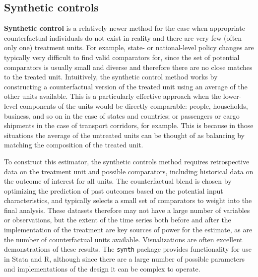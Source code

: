 \subsection{Synthetic controls}

\textbf{Synthetic control} is a relatively newer method
for the case when appropriate counterfactual individuals
do not exist in reality and there are very few (often only one) treatment units.\cite{abadie2015comparative}
For example, state- or national-level policy changes
are typically very difficult to find valid comparators for,
since the set of potential comparators is usually small and diverse
and therefore there are no close matches to the treated unit.
Intuitively, the synthetic control method works
by constructing a counterfactual version of the treated unit
using an average of the other units available.\cite{abadie2010synthetic}
This is a particularly effective approach
when the lower-level components of the units would be directly comparable:
people, households, business, and so on in the case of states and countries;
or passengers or cargo shipments in the case of transport corridors, for example.\cite{gobillon2016regional}
This is because in those situations the average of the untreated units
can be thought of as balancing by matching the composition of the treated unit.

To construct this estimator, the synthetic controls method requires
retrospective data on the treatment unit and possible comparators,
including historical data on the outcome of interest for all units.
The counterfactual blend is chosen by optimizing the prediction of past outcomes
based on the potential input characteristics,
and typically selects a small set of comparators to weight into the final analysis.
These datasets therefore may not have a large number of variables or observations,
but the extent of the time series both before and after the implementation
of the treatment are key sources of power for the estimate,
as are the number of counterfactual units available.
Visualizations are often excellent demonstrations of these results.
The \texttt{synth} package provides functionality for use in Stata and R,
although since there are a large number of possible parameters
and implementations of the design it can be complex to operate.
